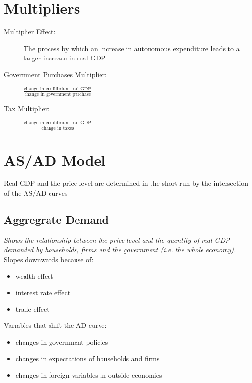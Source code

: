 \documentclass{article}
\begin{document}
\section{Multipliers}
\label{sec:multipliers}

\begin{description}
\item [Multiplier Effect:] The process by which an increase in autonomous expenditure leads to a larger increase in real GDP
\item [Government Purchases Multiplier:] $\frac{\mbox{change in equilibrium real GDP}}{\mbox{change in government purchase}}$
\item [Tax Multiplier:] $\frac{\mbox{change in equilibrium real GDP}}{\mbox{change in taxes}}$
\end{description}

\section{AS/AD Model}
\label{sec:asad}
Real GDP and the price level are determined in the short run by the intersection of the AS/AD curves
\subsection{Aggregrate Demand}
\label{sec:ad}
\textit{Shows the relationship between the price level and the quantity of real GDP demanded by households, firms and the government (i.e. the whole economy).}\\


Slopes downwards because of:
\begin{itemize}
\item wealth effect
\item interest rate effect 
\item trade effect\\
\end{itemize}

Variables that shift the AD curve:
\begin{itemize}
\item changes in government policies
\item changes in expectations of households and firms
\item changes in foreign variables in outside economies\\
\end{itemize}
\end{document}
